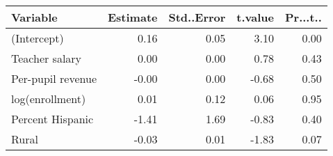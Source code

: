 \begin{tabular}{lrrrr}
  \hline
Variable & Estimate & Std..Error & t.value & Pr...t.. \\ 
  \hline
(Intercept) & 0.16 & 0.05 & 3.10 & 0.00 \\ 
  Teacher salary & 0.00 & 0.00 & 0.78 & 0.43 \\ 
  Per-pupil revenue & -0.00 & 0.00 & -0.68 & 0.50 \\ 
  log(enrollment) & 0.01 & 0.12 & 0.06 & 0.95 \\ 
  Percent Hispanic & -1.41 & 1.69 & -0.83 & 0.40 \\ 
  Rural & -0.03 & 0.01 & -1.83 & 0.07 \\ 
   \hline
\end{tabular}
